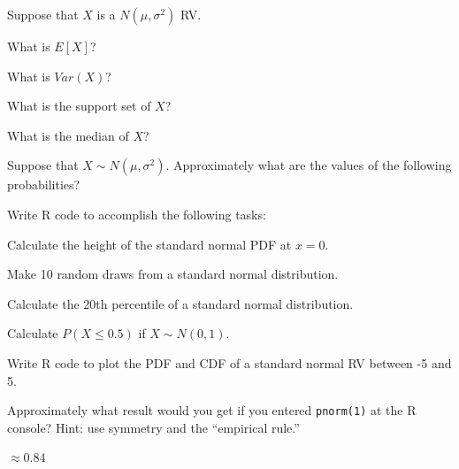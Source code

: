 \documentclass[addpoints,12pt]{exam}
\begin{document}
\begin{questions}


\question Suppose that $X$ is a $N(\mu, \sigma^2)$ RV. 
\begin{parts}
\item What is $E[X]$?
\item What is $Var(X)$?
\item What is the support set of $X$?
\item What is the median of $X$?
\end{parts}

\question Suppose that $X \sim N(\mu, \sigma^2)$. Approximately what are the values of the following probabilities?

\question Write R code to accomplish the following tasks:
\begin{parts}
 \item Calculate the height of the standard normal PDF at $x = 0$.
 \item Make 10 random draws from a standard normal distribution.
 \item Calculate the 20th percentile of a standard normal distribution.
  \item Calculate $P(X \leq 0.5)$ if $X \sim N(0,1)$.
\end{parts}

\question Write R code to plot the PDF and CDF of a standard normal RV between -5 and 5.

\question Approximately what result would you get if you entered \texttt{pnorm(1)} at the R console? Hint: use symmetry and the ``empirical rule.''
\begin{solution}
  $\approx 0.84$
\end{solution}


\end{questions}
\end{document}
